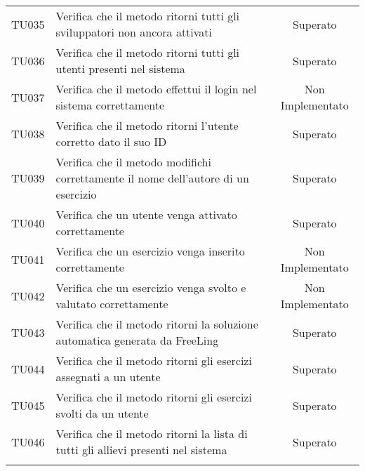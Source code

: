 \begin{tabularx}{\textwidth}{cXc}
		TU035 & Verifica che il metodo ritorni tutti gli sviluppatori non ancora attivati & Superato \\
		TU036 & Verifica che il metodo ritorni tutti gli utenti presenti nel sistema & Superato \\
		TU037 & Verifica che il metodo effettui il login nel sistema correttamente & Non Implementato \\
		TU038 & Verifica che il metodo ritorni l'utente corretto dato il suo ID & Superato \\
		TU039 & Verifica che il metodo modifichi correttamente il nome dell'autore di un esercizio & Superato \\
		TU040 & Verifica che un utente venga attivato correttamente & Superato \\
		TU041 & Verifica che un esercizio venga inserito correttamente & Non Implementato \\
		TU042 & Verifica che un esercizio venga svolto e valutato correttamente & Non Implementato \\
		TU043 & Verifica che il metodo ritorni la soluzione automatica generata da FreeLing & Superato \\
		TU044 & Verifica che il metodo ritorni gli esercizi assegnati a un utente & Superato \\
		TU045 & Verifica che il metodo ritorni gli esercizi svolti da un utente & Superato \\
		TU046 & Verifica che il metodo ritorni la lista di tutti gli allievi presenti nel sistema & Superato \\
		

\rowcolor{white}
\caption{Tabella requisiti di qualità}
\label{tab:tabellarequisitiqualità}
\end{tabularx}
